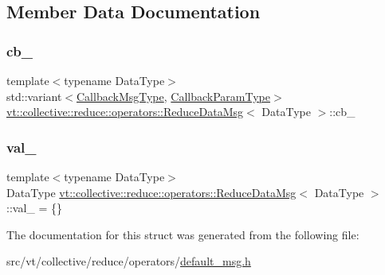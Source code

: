 \subsection{Member Data Documentation}
\mbox{\label{structvt_1_1collective_1_1reduce_1_1operators_1_1_reduce_data_msg_a2d550717b61c35d3ed89a657707cbe14}} 
\subsubsection{\texorpdfstring{cb\+\_\+}{cb\_}}
{\footnotesize\ttfamily template$<$typename Data\+Type$>$ \\
std\+::variant$<$\hyperlink{structvt_1_1collective_1_1reduce_1_1operators_1_1_reduce_data_msg_aa65f18bb2f7493d54e4b776787b7405c}{Callback\+Msg\+Type}, \hyperlink{structvt_1_1collective_1_1reduce_1_1operators_1_1_reduce_data_msg_a4a0c225ffa4221beb2bfba11ac33e5b6}{Callback\+Param\+Type}$>$ \hyperlink{structvt_1_1collective_1_1reduce_1_1operators_1_1_reduce_data_msg}{vt\+::collective\+::reduce\+::operators\+::\+Reduce\+Data\+Msg}$<$ Data\+Type $>$\+::cb\+\_\+\hspace{0.3cm}{\ttfamily [protected]}}

\mbox{\label{structvt_1_1collective_1_1reduce_1_1operators_1_1_reduce_data_msg_a3d393a0bf3245aeac348b66be4e566f9}} 
\subsubsection{\texorpdfstring{val\+\_\+}{val\_}}
{\footnotesize\ttfamily template$<$typename Data\+Type$>$ \\
Data\+Type \hyperlink{structvt_1_1collective_1_1reduce_1_1operators_1_1_reduce_data_msg}{vt\+::collective\+::reduce\+::operators\+::\+Reduce\+Data\+Msg}$<$ Data\+Type $>$\+::val\+\_\+ = \{\}\hspace{0.3cm}{\ttfamily [protected]}}



The documentation for this struct was generated from the following file\+:\begin{DoxyCompactItemize}
\item 
src/vt/collective/reduce/operators/\hyperlink{default__msg_8h}{default\+\_\+msg.\+h}\end{DoxyCompactItemize}
